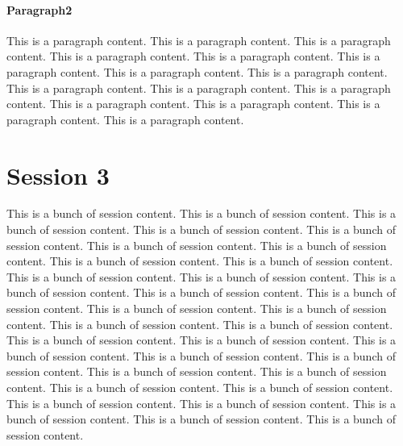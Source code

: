 \paragraph{Paragraph2}
This is a paragraph content. This is a paragraph content. This is a paragraph content. This is a paragraph content. This is a paragraph content. This is a paragraph content. This is a paragraph content. This is a paragraph content. This is a paragraph content. This is a paragraph content. This is a paragraph content. This is a paragraph content. This is a paragraph content. This is a paragraph content. This is a paragraph content.

\section{Session 3}
This is a bunch of session content. This is a bunch of session content. This is a bunch of session content. This is a bunch of session content. This is a bunch of session content. This is a bunch of session content. This is a bunch of session content. This is a bunch of session content. This is a bunch of session content. This is a bunch of session content. This is a bunch of session content. This is a bunch of session content. This is a bunch of session content. This is a bunch of session content. This is a bunch of session content. This is a bunch of session content. This is a bunch of session content. This is a bunch of session content. This is a bunch of session content. This is a bunch of session content. This is a bunch of session content. This is a bunch of session content. This is a bunch of session content. This is a bunch of session content. This is a bunch of session content. This is a bunch of session content. This is a bunch of session content. This is a bunch of session content. This is a bunch of session content. This is a bunch of session content. This is a bunch of session content. This is a bunch of session content.
